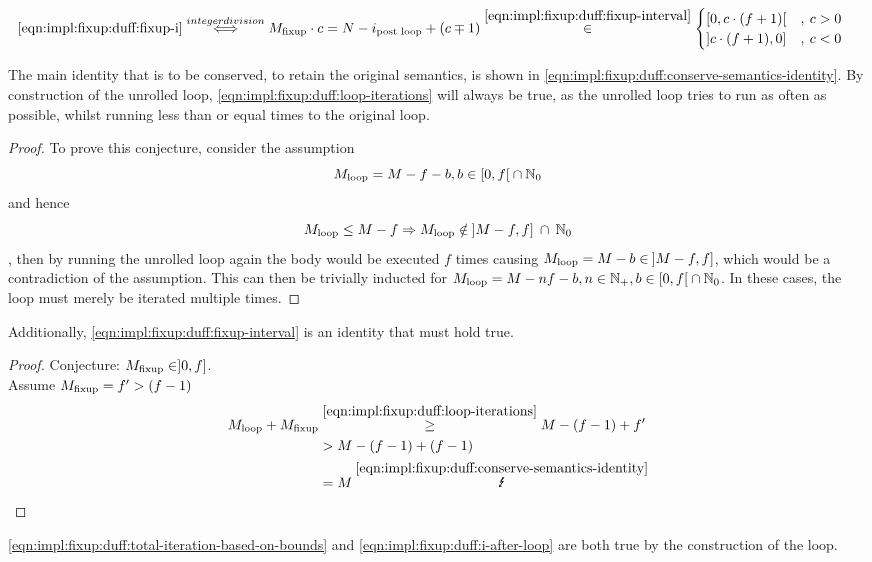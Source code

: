 \begin{equation}\label{eqn:impl:fixup:duff:fixup-i-mult}
\begin{aligned}
    \ref{eqn:impl:fixup:duff:fixup-i} &\overset{integer division}{\Longleftrightarrow} M_{\text{fixup}} \cdot c = N - i_\text{post loop} + (c \mp 1) \overset{\ref{eqn:impl:fixup:duff:fixup-interval}}{\in}  \begin{cases} \lbrack 0, c \cdot (f + 1) \lbrack &, \medspace c > 0\\ \rbrack c \cdot (f + 1), 0 \rbrack &, \medspace c < 0 \end{cases} 
\end{aligned}
\end{equation}

The main identity that is to be conserved, to retain the original semantics, is shown in \cref{eqn:impl:fixup:duff:conserve-semantics-identity}.
By construction of the unrolled loop, \cref{eqn:impl:fixup:duff:loop-iterations} will always be true, as the unrolled loop tries to run as often as possible, whilst running less than or equal times to the original loop.

\begin{proof}\label{proof:impl:fixup:duff:loop-iterations}
To prove this conjecture, consider the assumption
\[M_{\text{loop}} = M - f - b,  b \in \lbrack 0, f \lbrack \medspace \cap \medspace \mathbb{N}_0\]
and hence
\[M_{\text{loop}} \leq M - f \Rightarrow M_{\text{loop}} \notin \medspace \rbrack M-f,f \rbrack \medspace \cap \medspace \mathbb{N}_0 \]
, then by running the unrolled loop again the body would be executed $f$ times causing $M_{\text{loop}} = M - b \in \medspace \rbrack M-f,f \rbrack$, which would be a contradiction of the assumption.
This can then be trivially inducted for $M_{\text{loop}} = M - nf - b, n \in \mathbb{N}_{+}, b \in \lbrack 0, f \lbrack \medspace \cap \medspace \mathbb{N}_0$.
In these cases, the loop must merely be iterated multiple times.
\end{proof}

Additionally, \cref{eqn:impl:fixup:duff:fixup-interval} is an identity that must hold true.
\begin{proof}\label{proof:impl:fixup:duff:fixup-interval}
Conjecture: $M_{\text{fixup}} \in \rbrack 0,  f \rbrack$.\\

Assume $M_{\text{fixup}} = f' > (f - 1)$
\begin{align*}
    \Mloop + \Mfixup &\overset{\ref{eqn:impl:fixup:duff:loop-iterations}}{\geq} M - (f - 1) + f' \\
    &> M - (f - 1) + (f - 1) \\
    &= M \medspace \overset{\ref{eqn:impl:fixup:duff:conserve-semantics-identity}}{\mLightning}
\end{align*}
\end{proof}

\cref{eqn:impl:fixup:duff:total-iteration-based-on-bounds} and \cref{eqn:impl:fixup:duff:i-after-loop} are both true by the construction of the loop.

